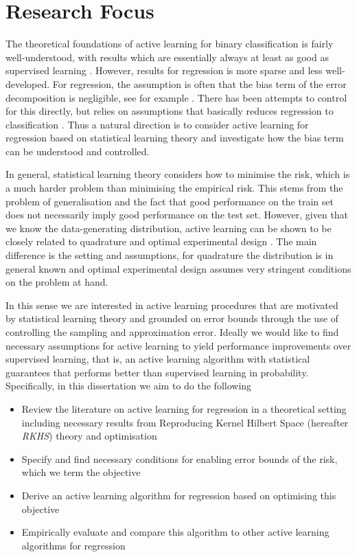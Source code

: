 \section{Research Focus}
The theoretical foundations of active learning for binary classification is
fairly well-understood, with results which are essentially always at least as
good as supervised learning \citep{balcan10_true_sampl_compl_activ_learn}. However,
results for regression is more sparse and less well-developed. For regression,
the assumption is often that the bias term of the error decomposition is
negligible, see for example \citep{cohn96_activ_learn_with_statis_model}. There has
been attempts to control for this directly, but relies on assumptions that
basically reduces regression to classification
\citep{willett06_faster_rates_regres_activ_learn}. Thus a natural direction is to
consider active learning for regression based on statistical learning theory and
investigate how the bias term can be understood and controlled.

In general, statistical learning theory considers how to minimise the risk,
which is a much harder problem than minimising the empirical risk. This stems
from the problem of generalisation and the fact that good performance on the
train set does not necessarily imply good performance on the test set. However,
given that we know the data-generating distribution, active learning can be
shown to be closely related to quadrature \citep{briol15_frank_wolfe_bayes} and
optimal experimental design \citep{fedorov10_optim_exper_desig}. The main
difference is the setting and assumptions, for quadrature the distribution is in
general known and optimal experimental design assumes very
stringent conditions on the problem at hand.

In this sense we are interested in active learning procedures that are motivated
by statistical learning theory and grounded on error bounds through the use of
controlling the sampling and approximation error. Ideally we would like to find
necessary assumptions for active learning to yield performance improvements over
supervised learning, that is, an active learning algorithm with statistical
guarantees that performs better than supervised learning in probability.
Specifically, in this dissertation we aim to do the following 

\begin{itemize}
\item Review the literature on active learning for regression in a theoretical
  setting including necessary results from Reproducing Kernel Hilbert Space
  (hereafter \emph{RKHS}) theory and optimisation
\item Specify and find necessary conditions for enabling error bounds of the risk,
  which we term the objective
\item Derive an active learning algorithm for regression based on optimising this objective
\item Empirically evaluate and compare this algorithm to other active learning
  algorithms for regression
\end{itemize}

